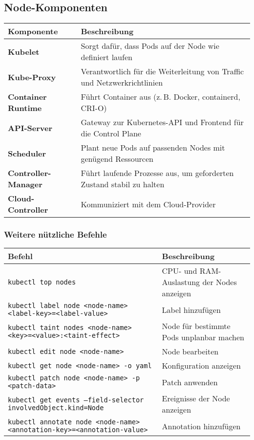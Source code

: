 \subsection{Node-Komponenten}
\begin{tabular}{|p{}|p{}|}
\hline
\textbf{Komponente} & \textbf{Beschreibung} \\
\hline
\textbf{Kubelet} & Sorgt dafür, dass Pods auf der Node wie definiert laufen \\
\textbf{Kube-Proxy} & Verantwortlich für die Weiterleitung von Traffic und Netzwerkrichtlinien \\
\textbf{Container Runtime} & Führt Container aus (z.\,B. Docker, containerd, CRI-O) \\
\textbf{API-Server} & Gateway zur Kubernetes-API und Frontend für die Control Plane \\
\textbf{Scheduler} & Plant neue Pods auf passenden Nodes mit genügend Ressourcen\\
\textbf{Controller-Manager} & Führt laufende Prozesse aus, um geforderten Zustand stabil zu halten \\
\textbf{Cloud-Controller} & Kommuniziert mit dem Cloud-Provider \\
\hline
\end{tabular}
\subsubsection{Weitere nützliche Befehle}
\begin{tabular}{|p{}|p{}|}
\hline
\textbf{Befehl} & \textbf{Beschreibung} \\
\hline
\texttt{kubectl top nodes} & CPU- und RAM-Auslastung der Nodes anzeigen \\
\texttt{kubectl label node <node-name> <label-key>=<label-value>} & Label hinzufügen \\
\texttt{kubectl taint nodes <node-name> <key>=<value>:<taint-effect>} & Node für bestimmte Pods unplanbar machen \\
\texttt{kubectl edit node <node-name>} & Node bearbeiten \\
\texttt{kubectl get node <node-name> -o yaml} & Konfiguration anzeigen \\
\texttt{kubectl patch node <node-name> -p <patch-data>} & Patch anwenden \\
\texttt{kubectl get events --field-selector involvedObject.kind=Node} & Ereignisse der Node anzeigen \\
\texttt{kubectl annotate node <node-name> <annotation-key>=<annotation-value>} & Annotation hinzufügen \\
\hline
\end{tabular}
